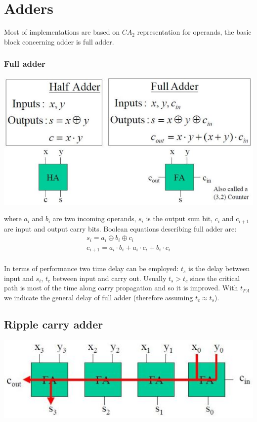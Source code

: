 \chapter{Adders}

Most of implementations are based on $CA_2$ representation for operands, the basic block concerning adder is full adder.

\subsection{Full adder}
\begin{center}
  \includegraphics[width=0.7\linewidth]{img/img2/1}
\end{center}

where $a_i$ and $b_i$ are two incoming operands, $s_i$ is the output sum bit, $c_i$ and $c_{i+1}$ are input and output carry bits. Boolean equations describing full adder are:
\begin{eqnarray*}
s_i=a_i \oplus b_i \oplus c_i\\
c_{i+1}=a_i \cdot b_i+a_i \cdot  c_i+b_i \cdot c_i\\
\end{eqnarray*}

In terms of performance two time delay can be employed: $t_s$ is the delay between input and $s_i$, $t_c$ between input and carry out. Usually $t_s > t_c$ since the critical path is most of the time along carry propagation and so it is improved. With $t_{FA}$ we indicate the general delay of full adder (therefore assuming $t_c \approx t_s$).

\section{Ripple carry adder}
\begin{center}
  \includegraphics[width=0.7\linewidth]{img/img2/2}
\end{center}

